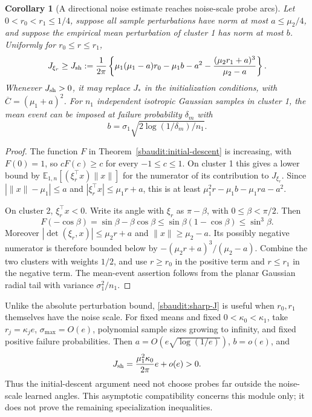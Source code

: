 \documentclass[11pt]{article}
\newtheorem{corollary}[theorem]{Corollary}
\theoremstyle{remark}
\begin{document}
\begin{corollary}[A directional noise estimate reaches noise-scale probe arcs]
\label{sbaudit:sharp-noise}
Let $0<r_0<r_1\le1/4$, suppose all sample perturbations have norm at most
$a\le\mu_2/4$, and suppose the empirical mean perturbation of cluster 1
has norm at most $b$. Uniformly for $r_0\le r\le r_1$,
\begin{equation}\label{sbaudit:sharp-J}
 J_{\xi_r}\ge J_{\rm sh}:=\frac1{2\pi}
 \left\{\mu_1(\mu_1-a)r_0-\mu_1b-a^2
              -\frac{(\mu_2r_1+a)^3}{\mu_2-a}\right\}.
\end{equation}
Whenever $J_{\rm sh}>0$, it may replace $J_*$ in the initialization
conditions, with $\overline C=(\mu_1+a)^2$.
For $n_1$ independent isotropic Gaussian samples in cluster 1, the mean
event can be imposed at failure probability $\delta_m$ with
\[
 b=\sigma_1\sqrt{2\log(1/\delta_m)/n_1}.
\]
\end{corollary}
\begin{proof}
The function $F$ in Theorem~\ref{sbaudit:initial-descent} is increasing,
with $F(0)=1$, so $cF(c)\ge c$ for every $-1\le c\le1$.
On cluster 1 this gives a lower bound by
$\mathbb E_{1,n}[(\xi_r^\top x)\|x\|]$ for the numerator of its
contribution to $J_{\xi_r}$. Since
$|\|x\|-\mu_1|\le a$ and $|\xi_r^\top x|\le\mu_1r+a$,
this is at least
$\mu_1^2r-\mu_1b-\mu_1ra-a^2$.

On cluster 2, $\xi_r^\top x<0$. Write its angle with $\xi_r$ as
$\pi-\beta$, with $0\le\beta<\pi/2$. Then
\[
 F(-\cos\beta)=\sin\beta-\beta\cos\beta
 \le\sin\beta(1-\cos\beta)\le\sin^3\beta.
\]
Moreover $|\det(\xi_r,x)|\le\mu_2r+a$ and $\|x\|\ge\mu_2-a$.
Its possibly negative numerator is therefore bounded below by
$-(\mu_2r+a)^3/(\mu_2-a)$. Combine the two clusters with weights
$1/2$, and use $r\ge r_0$ in the positive term and $r\le r_1$ in the
negative term. The mean-event assertion follows from the planar
Gaussian radial tail with variance $\sigma_1^2/n_1$.
\end{proof}

Unlike the absolute perturbation bound, \eqref{sbaudit:sharp-J} is useful
when $r_0,r_1$ themselves have the noise scale. For fixed means and fixed
$0<\kappa_0<\kappa_1$, take $r_j=\kappa_j e$,
$\sigma_{\max}=O(e)$, polynomial sample sizes growing to infinity,
and fixed positive failure probabilities. Then
$a=O(e\sqrt{\log(1/e)})$, $b=o(e)$, and
\[
 J_{\rm sh}=\frac{\mu_1^2\kappa_0}{2\pi}e+o(e)>0.
\]
Thus the initial-descent argument need not choose probes far outside the
noise-scale learned angles. This asymptotic compatibility concerns this
module only; it does not prove the remaining specialization inequalities.
\end{document}
